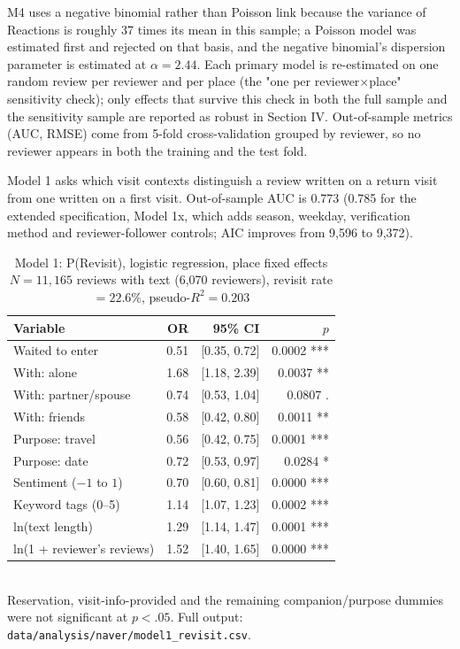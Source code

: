 \documentclass[10pt,a4paper]{article}
\newcommand{\sect}[1]{\vspace{10pt}\noindent{\Large\bfseries #1}\par\vspace{3pt}}
\newcommand{\subsect}[1]{\vspace{6pt}\noindent{\large\bfseries #1}\par\vspace{2pt}}
\begin{document}
M4 uses a negative binomial rather than Poisson link because the variance of
Reactions is roughly 37 times its mean in this sample; a Poisson model was
estimated first and rejected on that basis, and the negative binomial's
dispersion parameter is estimated at $\alpha = 2.44$. Each primary model is
re-estimated on one random review per reviewer and per place (the "one per
reviewer$\times$place" sensitivity check); only effects that survive this
check in both the full sample and the sensitivity sample are reported as
robust in Section IV. Out-of-sample metrics (AUC, RMSE) come from 5-fold
cross-validation grouped by reviewer, so no reviewer appears in both the
training and the test fold.

\tblVIF

\sect{IV. Results}

\subsect{4.1 Revisit (Model 1)}
Model 1 asks which visit contexts distinguish a review written on a return
visit from one written on a first visit. Out-of-sample AUC is 0.773 (0.785
for the extended specification, Model 1x, which adds season, weekday,
verification method and reviewer-follower controls; AIC improves from 9{,}596
to 9{,}372).

\begin{table}[H]\centering
\caption{Model 1: P(Revisit), logistic regression, place fixed effects\\
\footnotesize $N = 11{,}165$ reviews with text (6{,}070 reviewers), revisit rate $= 22.6\%$, pseudo-$R^2 = 0.203$}
\footnotesize
\begin{tabular}{@{}lrrr@{}}
\toprule
Variable & OR & 95\% CI & $p$ \\
\midrule
Waited to enter          & 0.51 & [0.35, 0.72] & 0.0002 *** \\
With: alone               & 1.68 & [1.18, 2.39] & 0.0037 ** \\
With: partner/spouse      & 0.74 & [0.53, 1.04] & 0.0807 . \\
With: friends              & 0.58 & [0.42, 0.80] & 0.0011 ** \\
Purpose: travel            & 0.56 & [0.42, 0.75] & 0.0001 *** \\
Purpose: date               & 0.72 & [0.53, 0.97] & 0.0284 * \\
Sentiment ($-1$ to $1$)    & 0.70 & [0.60, 0.81] & 0.0000 *** \\
Keyword tags (0--5)        & 1.14 & [1.07, 1.23] & 0.0002 *** \\
ln(text length)             & 1.29 & [1.14, 1.47] & 0.0001 *** \\
ln(1 + reviewer's reviews) & 1.52 & [1.40, 1.65] & 0.0000 *** \\
\bottomrule
\end{tabular}
\\[3pt]
{\scriptsize Reservation, visit-info-provided and the remaining companion/purpose dummies were not significant at $p<.05$. Full output: \texttt{data/analysis/naver/model1\_revisit.csv}.}
\end{table}
\end{document}
